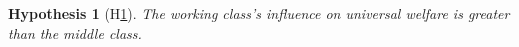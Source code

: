 \documentclass[12pt, letterpage, notitlepage]{article}
\newtheorem{hyp}{Hypothesis}
\begin{document}
\begin{hyp}[H\ref{hyp:first}] \label{hyp:first}
	The working class's influence on universal welfare is greater than the middle class.
\end{hyp}



\end{document}
